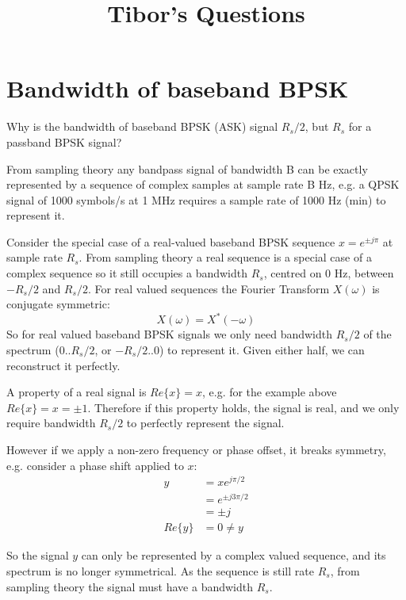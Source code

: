 \documentclass{article}
\begin{document}
\title{Tibor's Questions}
\maketitle

\section{Bandwidth of baseband BPSK}

Why is the bandwidth of baseband BPSK (ASK) signal $R_s/2$, but $R_s$ for a passband BPSK signal?

From sampling theory any bandpass signal of bandwidth B can be exactly represented by a sequence of complex samples at sample rate B Hz, e.g. a QPSK signal of 1000 symbols/s at 1 MHz requires a sample rate of 1000 Hz (min) to represent it.

Consider the special case of a real-valued baseband BPSK sequence $x = e^{\pm j \pi}$ at sample rate $R_s$.  From sampling theory a real sequence is a special case of a complex sequence so it still occupies a bandwidth $R_s$, centred on 0 Hz, between $-R_s/2$ and $R_s/2$. For real valued sequences the Fourier Transform $X(\omega)$ is conjugate symmetric:
\begin{equation}
X(\omega) = X^*(-\omega)
\end{equation}
So for real valued baseband BPSK signals we only need bandwidth $R_s/2$ of the spectrum ($0..R_s/2$, or $-R_s/2..0$) to represent it.  Given either half, we can reconstruct it perfectly.

A property of a real signal is $Re\{x\} = x$, e.g. for the example above $Re\{x\} = x = \pm 1$. Therefore if this property holds, the signal is real, and we only require bandwidth $R_s/2$ to perfectly represent the signal.
            
However if we apply a non-zero frequency or phase offset, it breaks symmetry, e.g. consider a phase shift applied to $x$:
\begin{equation}
\begin{split}
y &= x e^{j \pi/2} \\
  &= e^{\pm j3 \pi /2} \\
  &= \pm j \\
Re\{y\} &= 0 \ne y
\end{split}
\end{equation}

So the signal $y$ can only be represented by a complex valued sequence, and its spectrum is no longer symmetrical.  As the sequence is still rate $R_s$, from sampling theory the signal must have a bandwidth $R_s$.
\end{document}
